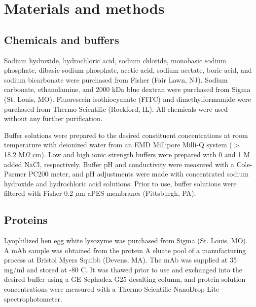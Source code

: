 \documentclass[preprint,review,12pt]{elsarticle}
\begin{document}
\section{Materials and methods} \label{sec:mm}

    \subsection{Chemicals and buffers} \label{ssec:buffers}
        Sodium hydroxide, hydrochloric acid, sodium chloride, monobasic sodium phosphate, dibasic sodium phosphate, acetic acid, sodium acetate, boric acid, and sodium bicarbonate were purchased from Fisher (Fair Lawn, NJ). Sodium carbonate, ethanolamine, and 2000 kDa blue dextran were purchased from Sigma (St. Louis, MO). Fluorescein isothiocyanate (FITC) and dimethylformamide were purchased from Thermo Scientific (Rockford, IL). All chemicals were used without any further purification.

        Buffer solutions were prepared to the desired constituent concentrations at room temperature with deionized water from an EMD Millipore Milli-Q system ($>$ 18.2 M$\Omega$ cm). Low and high ionic strength buffers were prepared with 0 and 1 M added NaCl, respectively. Buffer pH and conductivity were measured with a Cole-Parmer PC200 meter, and pH adjustments were made with concentrated sodium hydroxide and hydrochloric acid solutions. Prior to use, buffer solutions were filtered with Fisher 0.2 $\mu$m aPES membranes (Pittsburgh, PA).

    \subsection{Proteins} \label{ssec:proteins}
        Lyophilized hen egg white lysozyme was purchased from Sigma (St. Louis, MO). A mAb sample was obtained from the protein A eluate pool of a manufacturing process at Bristol Myers Squibb (Devens, MA). The mAb was supplied at 35 mg/ml and stored at -80 \degree C. It was thawed prior to use and exchanged into the desired buffer using a GE Sephadex G25 desalting column, and protein solution concentrations were measured with a Thermo Scientific NanoDrop Lite spectrophotometer.
\end{document}
